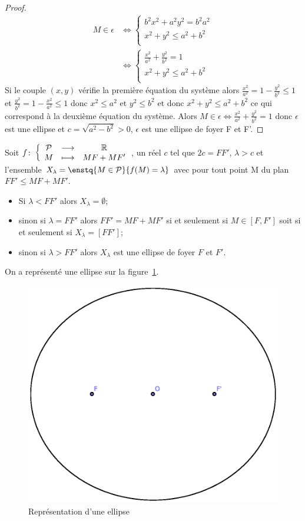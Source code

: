\begin{proof}
\begin{align}
  M \in \epsilon & \iff \begin{cases} b^2x^2 +a^2y^2=b^2a^2 \\ x^2+y^2 \leq a^2 +b^2\\\end{cases}\\
  & \iff \begin{cases} \frac{x^2}{a^2} +\frac{y^2}{b^2}=1\\ x^2+y^2 \leq a^2 +b^2 \\\end{cases}
\end{align}
Si le couple $(x,y)$ vérifie la première équation du système alors $\frac{x^2}{a^2}=1-\frac{y^2}{b^2}\leq 1$ et $\frac{y^2}{b^2}=1-\frac{x^2}{a^2} \leq 1$ donc $x^2 \leq a^2$ et $y^2 \leq b^2$ et donc $x^2+y^2 \leq a^2+b^2$ ce qui correspond à la deuxième équation du système.
Alors $M \in \epsilon \iff \frac{x^2}{a^2} +\frac{y^2}{b^2}=1$ donc $\epsilon$ est une ellipse et $c=\sqrt{a^2-b^2}>0$, $\epsilon$ est une ellipse de foyer F et F'.
\end{proof}
Soit $f\colon \left\{\begin{array}{ccc} \mathcal{P} & \longrightarrow &\mathbb{R}\\ M & \longmapsto & MF+MF' \end{array} \right.$, un réel $c$ tel que $2c=FF'$, $\lambda>c$ et l'ensemble $X_\lambda=\enstq{M \in \P}{f(M)=\lambda}$ avec pour tout point M du plan $FF'\leq MF+MF'$.
\begin{itemize}
\item Si $\lambda < FF'$ alors $X_\lambda=\emptyset$;
\item sinon si $\lambda=FF'$ alors $FF'=MF+MF'$ si et seulement si $M \in [F,F']$ soit si et seulement si $X_\lambda=[FF']$;
\item sinon si $\lambda >FF'$ alors $X_\lambda$ est une ellipse de foyer $F$ et $F'$.
\end{itemize}

On a représenté une ellipse sur la figure~\ref{fig:ellipse}.

\begin{figure}[!h]
  \centering
  \includegraphics[width=\textwidth]{./ellipse.eps}
  \caption{Représentation d'une ellipse}
  \label{fig:ellipse}
\end{figure}



